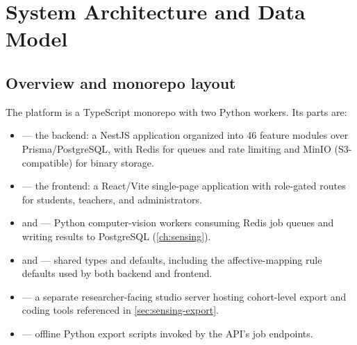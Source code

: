 \chapter{System Architecture and Data Model}
\label{ch:architecture}


\section{Overview and monorepo layout}
\label{sec:arch-overview}

The platform is a TypeScript monorepo with two Python workers. Its parts
are:

\begin{itemize}
  \item {} --- the backend: a NestJS application organized
  into 46 feature modules over Prisma/PostgreSQL, with Redis for queues
  and rate limiting and MinIO (S3-compatible) for binary storage.
  \item {} --- the frontend: a React/Vite single-page
  application with role-gated routes for students, teachers, and
  administrators.
  \item {} and  ---
  Python computer-vision workers consuming Redis job queues and writing
  results to PostgreSQL (\cref{ch:sensing}).
  \item {} and  --- shared
  types and defaults, including the affective-mapping rule defaults used
  by both backend and frontend.
  \item {} --- a separate researcher-facing studio server
  hosting cohort-level export and coding tools referenced in
  \cref{sec:sensing-export}.
  \item {} --- offline Python export scripts invoked by the
  API's job endpoints.
\end{itemize}

